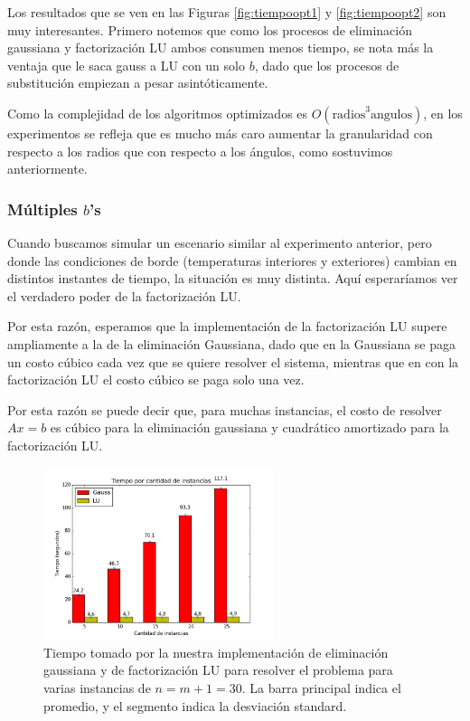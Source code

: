 Los resultados que se ven en las Figuras \ref{fig:tiempoopt1} y \ref{fig:tiempoopt2} son muy interesantes. Primero notemos que como los procesos de eliminación gaussiana y factorización LU ambos consumen menos tiempo, se nota más la ventaja que le saca gauss a LU con un solo $b$, dado que los procesos de substitución empiezan a pesar asintóticamente.


Como la complejidad de los algoritmos optimizados es $O(\text{radios}^3   \text{angulos})$, en los experimentos se refleja que es mucho más caro aumentar la granularidad con respecto a los radios que con respecto a los ángulos, como sostuvimos anteriormente.

\subsubsection{Múltiples $b$'s}

Cuando buscamos simular un escenario similar al experimento anterior, pero donde las condiciones de borde (temperaturas interiores y exteriores) cambian en distintos instantes de tiempo, la situación es muy distinta. Aquí esperaríamos ver el verdadero poder de la factorización LU.

Por esta razón, esperamos que la implementación de la factorización LU supere ampliamente a la de la eliminación Gaussiana, dado que en la Gaussiana se paga un costo cúbico cada vez que se quiere resolver el sistema, mientras que en con la factorización LU el costo cúbico se paga solo una vez.

Por esta razón se puede decir que, para muchas instancias, el costo de resolver $Ax = b$ es cúbico para la eliminación gaussiana y cuadrático amortizado para la factorización LU.

\begin{figure}[H]
\centering  
 \includegraphics[width=0.6\textwidth]{imgs/tiempos_ninst.png}
 \caption{\footnotesize{Tiempo tomado por la nuestra implementación de eliminación gaussiana y de factorización LU para resolver el problema para varias instancias de $n = m+1 = 30$. La barra principal indica el promedio, y el segmento indica la desviación standard.}}
\label{fig:tiemponinst}
\end{figure}


